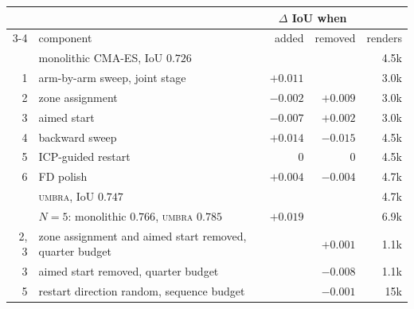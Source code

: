 \begin{tabular}{@{}rlrrr@{}}
\toprule
 & & \multicolumn{2}{c}{$\Delta$ IoU when} & \\
\cmidrule(lr){3-4}
 & component & added & removed & renders \\
\midrule
 & monolithic CMA-ES, IoU $0.726$ & & & 4.5k \\
1 & arm-by-arm sweep, joint stage & $+0.011$ &  & 3.0k \\
2 & zone assignment & $-0.002$ & $\mathbf{+0.009}$ & 3.0k \\
3 & aimed start & $-0.007$ & $+0.002$ & 3.0k \\
4 & backward sweep & $\mathbf{+0.014}$ & $\mathbf{-0.015}$ & 4.5k \\
5 & ICP-guided restart & $0$ & $0$ & 4.5k \\
6 & FD polish & $\mathbf{+0.004}$ & $\mathbf{-0.004}$ & 4.7k \\
 & \textsc{umbra}, IoU $0.747$ & & & 4.7k \\
\midrule
 & $N{=}5$: monolithic $0.766$, \textsc{umbra} $0.785$ & $\mathbf{+0.019}$ & & 6.9k \\
2, 3 & zone assignment and aimed start removed, quarter budget & & $+0.001$ & 1.1k \\
3 & aimed start removed, quarter budget & & $-0.008$ & 1.1k \\
5 & restart direction random, sequence budget & & $-0.001$ & 15k \\
\bottomrule
\end{tabular}
